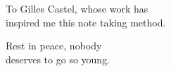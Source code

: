 To Gilles Castel, whose work has \\
inspired me this note taking method.

\vspace{1em}

Rest in peace, nobody \\
deserves to go so young.